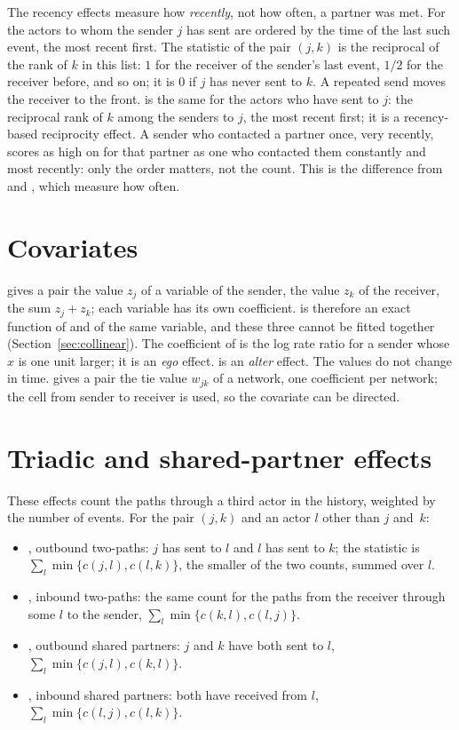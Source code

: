 The recency effects measure how \emph{recently}, not how often, a partner was met. For  the actors to whom the sender $j$ has sent are ordered by the time of the last such event, the most recent first. The statistic of the pair $(j,k)$ is the reciprocal of the rank of $k$ in this list: $1$ for the receiver of the sender's last event, $1/2$ for the receiver before, and so on; it is $0$ if $j$ has never sent to $k$. A repeated send moves the receiver to the front.  is the same for the actors who have sent to $j$: the reciprocal rank of $k$ among the senders to $j$, the most recent first; it is a recency-based reciprocity effect. A sender who contacted a partner once, very recently, scores as high on  for that partner as one who contacted them constantly and most recently: only the order matters, not the count. This is the difference from  and , which measure how often.

\section{Covariates}\label{sec:cov-def}

 gives a pair the value $z_j$ of a variable of the sender,  the value $z_k$ of the receiver,  the sum $z_j+z_k$; each variable has its own coefficient.  is therefore an exact function of  and  of the same variable, and these three cannot be fitted together (Section~\ref{sec:collinear}). The coefficient of  is the log rate ratio for a sender whose $x$ is one unit larger; it is an \emph{ego} effect.  is an \emph{alter} effect. The values do not change in time.  gives a pair the tie value $w_{jk}$ of a network, one coefficient per network; the cell from sender to receiver is used, so the covariate can be directed.

\section{Triadic and shared-partner effects}\label{sec:triadic}

These effects count the paths through a third actor in the history, weighted by the number of events. For the pair $(j,k)$ and an actor $l$ other than $j$ and~$k$:
\begin{itemize}[nosep]
  \item {}, outbound two-paths: $j$ has sent to $l$ and $l$ has sent to $k$; the statistic is $\sum_l\min\{c(j,l),c(l,k)\}$, the smaller of the two counts, summed over $l$.
  \item {}, inbound two-paths: the same count for the paths from the receiver through some $l$ to the sender, $\sum_l\min\{c(k,l),c(l,j)\}$.
  \item {}, outbound shared partners: $j$ and $k$ have both sent to $l$, $\sum_l\min\{c(j,l),c(k,l)\}$.
  \item {}, inbound shared partners: both have received from $l$, $\sum_l\min\{c(l,j),c(l,k)\}$.
\end{itemize}
